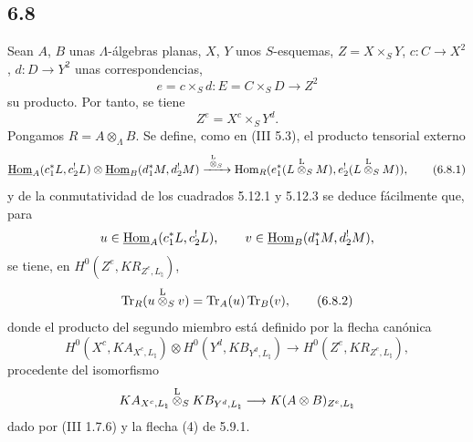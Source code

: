 \subsection*{6.8}
Sean $A$, $B$ unas $\Lambda$-álgebras planas, $X$, $Y$ unos $S$-esquemas, $Z=X\times_SY$, $c:C\to X^2$, $d:D\to Y^2$ unas correspondencias,
\[
e=c\times_Sd:E=C\times_SD\longrightarrow Z^2
\]
su producto. Por tanto, se tiene
\[
Z^e=X^c\times_SY^d.
\]
Pongamos $R=A\otimes_{\Lambda}B$. Se define, como en (III 5.3), el producto tensorial externo
\begin{equation}
\underline{\operatorname{Hom}}_A(c_1^*L,c_2^!L)\otimes \underline{\operatorname{Hom}}_B(d_1^*M,d_2^!M)
\xrightarrow{\ \overset{\mathrm L}{\otimes}_S\ }
\operatorname{Hom}_R(e_1^*(L\overset{\mathrm L}{\otimes}_SM),e_2^!(L\overset{\mathrm L}{\otimes}_SM)),
\tag{6.8.1}
\end{equation}
y de la conmutatividad de los cuadrados 5.12.1 y 5.12.3 se deduce fácilmente que, para
\[
u\in\underline{\operatorname{Hom}}_A(c_1^*L,c_2^!L),\qquad v\in\underline{\operatorname{Hom}}_B(d_1^*M,d_2^!M),
\]
se tiene, en $H^0(Z^e,KR_{Z^e,L_{\natural}})$,
\begin{equation}
\operatorname{Tr}_R(u\overset{\mathrm L}{\otimes}_Sv)=\operatorname{Tr}_A(u)\operatorname{Tr}_B(v),
\tag{6.8.2}
\end{equation}
donde el producto del segundo miembro está definido por la flecha canónica
\begin{equation}
H^0(X^c,KA_{X^c,L_{\natural}})\otimes
H^0(Y^d,KB_{Y^d,L_{\natural}})
\longrightarrow
H^0(Z^e,KR_{Z^e,L_{\natural}}),
\tag{6.8.3}
\end{equation}
procedente del isomorfismo
\[
KA_{X^c,L_{\natural}}\overset{\mathrm L}{\otimes}_S KB_{Y^d,L_{\natural}}\longrightarrow K(A\otimes B)_{Z^e,L_{\natural}}
\]
dado por (III 1.7.6) y la flecha (4) de 5.9.1.
